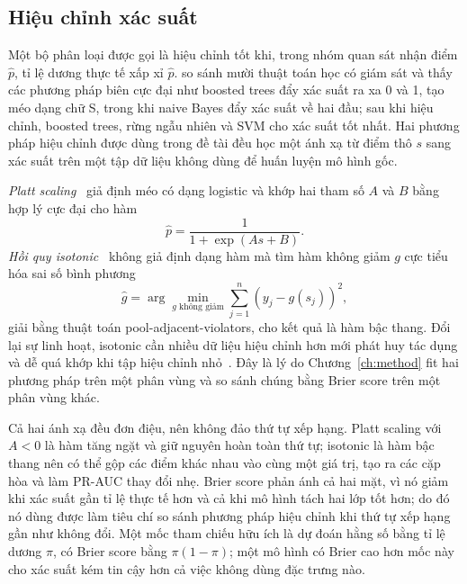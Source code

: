 \documentclass[12pt,a4paper]{report}
\begin{document}
\subsection{Hiệu chỉnh xác suất}\label{sec:th-calibration}

Một bộ phân loại được gọi là hiệu chỉnh tốt khi, trong nhóm quan sát nhận điểm $\hat p$, tỉ lệ dương thực tế xấp xỉ $\hat p$. \textcite{niculescumizil2005} so sánh mười thuật toán học có giám sát và thấy các phương pháp biên cực đại như boosted trees đẩy xác suất ra xa 0 và 1, tạo méo dạng chữ S, trong khi naive Bayes đẩy xác suất về hai đầu; sau khi hiệu chỉnh, boosted trees, rừng ngẫu nhiên và SVM cho xác suất tốt nhất. Hai phương pháp hiệu chỉnh được dùng trong đề tài đều học một ánh xạ từ điểm thô $s$ sang xác suất trên một tập dữ liệu không dùng để huấn luyện mô hình gốc.

\emph{Platt scaling}~\parencite{platt1999} giả định méo có dạng logistic và khớp hai tham số $A$ và $B$ bằng hợp lý cực đại cho hàm
\begin{equation}\label{eq:th-platt}
  \hat{p} = \frac{1}{1 + \exp(A s + B)} .
\end{equation}
\emph{Hồi quy isotonic}~\parencite{zadrozny2002} không giả định dạng hàm mà tìm hàm không giảm $g$ cực tiểu hóa sai số bình phương
\begin{equation}\label{eq:th-isotonic}
  \hat{g} = \arg\min_{g \text{ không giảm}} \sum_{j=1}^{n} \left( y_j - g(s_j) \right)^2 ,
\end{equation}
giải bằng thuật toán pool-adjacent-violators, cho kết quả là hàm bậc thang. Đổi lại sự linh hoạt, isotonic cần nhiều dữ liệu hiệu chỉnh hơn mới phát huy tác dụng và dễ quá khớp khi tập hiệu chỉnh nhỏ~\parencite{niculescumizil2005}. Đây là lý do Chương~\ref{ch:method} fit hai phương pháp trên một phân vùng và so sánh chúng bằng Brier score trên một phân vùng khác.

Cả hai ánh xạ đều đơn điệu, nên không đảo thứ tự xếp hạng. Platt scaling với $A<0$ là hàm tăng ngặt và giữ nguyên hoàn toàn thứ tự; isotonic là hàm bậc thang nên có thể gộp các điểm khác nhau vào cùng một giá trị, tạo ra các cặp hòa và làm PR-AUC thay đổi nhẹ. Brier score phản ánh cả hai mặt, vì nó giảm khi xác suất gần tỉ lệ thực tế hơn và cả khi mô hình tách hai lớp tốt hơn; do đó nó dùng được làm tiêu chí so sánh phương pháp hiệu chỉnh khi thứ tự xếp hạng gần như không đổi. Một mốc tham chiếu hữu ích là dự đoán hằng số bằng tỉ lệ dương $\pi$, có Brier score bằng $\pi(1-\pi)$; một mô hình có Brier cao hơn mốc này cho xác suất kém tin cậy hơn cả việc không dùng đặc trưng nào.
\end{document}
